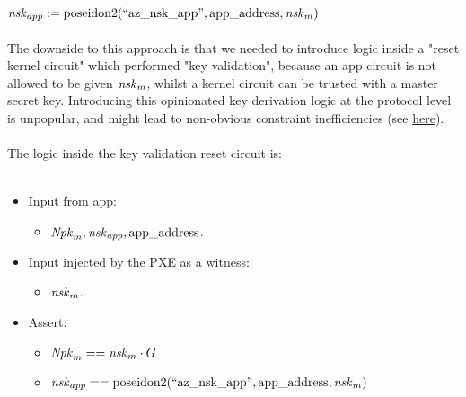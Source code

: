 \hfill\\
\\
$\nskapp := \poseidon(\text{``az\_nsk\_app''}, \appaddress, \nskm)$\\
\\
The downside to this approach is that we needed to introduce logic inside a "reset kernel circuit" which performed "key validation", because an app circuit is not allowed to be given $\nskm$, whilst a kernel circuit can be trusted with a master secret key.
Introducing this opinionated key derivation logic at the protocol level is unpopular, and might lead to non-obvious constraint inefficiencies (see \href{https://hackmd.io/@aztec-network/HyqlobuIR?type=view}{here}).\\
\\
The logic inside the key validation reset circuit is:\\
\\
\begin{itemize}
    \item Input from app:
    \begin{itemize}
        \item $\Npkm, \nskapp, \appaddress$.
    \end{itemize}
    \item Input injected by the PXE as a witness:
    \begin{itemize}
        \item $\nskm$.
    \end{itemize}
    \item Assert:
    \begin{itemize}
        \item $\Npkm == \nskm \cdot G$
        \item $\nskapp == \poseidon(\text{``az\_nsk\_app''}, \appaddress, \nskm)$ 
    \end{itemize}
\end{itemize}


